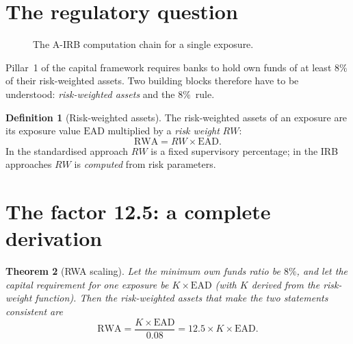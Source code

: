 \documentclass[11pt,a4paper]{report}
\theoremstyle{definition}
\newtheorem{definition}{Definition}[chapter]
\theoremstyle{plain}
\newtheorem{theorem}[definition]{Theorem}
\newcommand{\PD}{\mathrm{PD}}
\newcommand{\LGD}{\mathrm{LGD}}
\newcommand{\EAD}{\mathrm{EAD}}
\newcommand{\RWA}{\mathrm{RWA}}
\begin{document}
\section{The regulatory question}

\begin{figure}[htbp]
\centering
{}
\caption{The A-IRB computation chain for a single exposure.}
\label{fig:chain}
\end{figure}

Pillar~1 of the capital framework requires banks to hold own funds of at
least $8\%$ of their risk-weighted assets. Two building blocks therefore
have to be understood: \emph{risk-weighted assets} and the $8\%$\ rule.

\begin{definition}[Risk-weighted assets]
The risk-weighted assets of an exposure are its exposure value
$\EAD$ multiplied by a \emph{risk weight} $RW$:
\begin{equation}
  \RWA = RW \times \EAD .
\end{equation}
In the standardised approach $RW$ is a fixed supervisory percentage;
in the IRB approaches $RW$ is \emph{computed} from risk parameters.
\end{definition}

\section{The factor 12.5: a complete derivation}

\begin{theorem}[RWA scaling]
Let the minimum own funds ratio be $8\%$, and let the capital
requirement for one exposure be $K\times\EAD$ (with $K$ derived from the
risk-weight function). Then the risk-weighted assets that make the two
statements consistent are
\begin{equation}
  \RWA = \frac{K\times\EAD}{0.08} = 12.5 \times K \times \EAD .
  \label{eq:scaling}
\end{equation}
\end{theorem}
\end{document}
